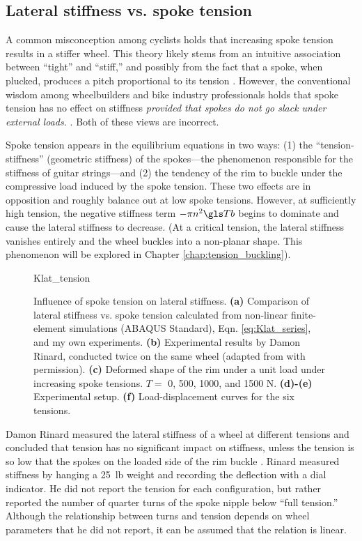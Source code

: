 \documentclass[\rootdir/thesis.tex]{subfiles}
\begin{document}
\subsection{Lateral stiffness vs. spoke tension}

A common misconception among cyclists holds that increasing spoke tension results in a stiffer wheel. This theory likely stems from an intuitive association between ``tight'' and ``stiff,'' and possibly from the fact that a spoke, when plucked, produces a pitch proportional to its tension \cite{Allen1997}. However, the conventional wisdom among wheelbuilders and bike industry professionals holds that spoke tension has no effect on stiffness \emph{provided that spokes do not go slack under external loads.} \cite{Rinard,Kopecky2013,Hjertberg2014,Glaskin2015}. Both of these views are incorrect.

Spoke tension appears in the equilibrium equations in two ways: (1) the ``tension-stiffness'' (geometric stiffness) of the spokes---the phenomenon responsible for the stiffness of guitar strings---and (2) the tendency of the rim to buckle under the compressive load induced by the spoke tension. These two effects are in opposition and roughly balance out at low spoke tensions. However, at sufficiently high tension, the negative stiffness term $-\pi n^2 \Tb$ begins to dominate and cause the lateral stiffness to decrease. (At a critical tension, the lateral stiffness vanishes entirely and the wheel buckles into a non-planar shape. This phenomenon will be explored in Chapter \ref{chap:tension_buckling}).

\begin{figure}[t]
\centering
{Klat_tension}
\caption{Influence of spoke tension on lateral stiffness. \textbf{(a)} Comparison of lateral stiffness vs. spoke tension calculated from non-linear finite-element simulations (ABAQUS Standard), Eqn. \eqref{eq:Klat_series}, and my own experiments. \textbf{(b)} Experimental results by Damon Rinard, conducted twice on the same wheel (adapted from \cite{Rinard} with permission). \textbf{(c)} Deformed shape of the rim under a unit load under increasing spoke tensions. $T=\,\,$0, 500, 1000, and 1500 N. \textbf{(d)-(e)} Experimental setup. \textbf{(f)} Load-displacement curves for the six tensions.}
\label{fig:Klat_tension}
\end{figure}

Damon Rinard measured the lateral stiffness of a wheel at different tensions and concluded that tension has no significant impact on stiffness, unless the tension is so low that the spokes on the loaded side of the rim buckle \cite{Rinard}. Rinard measured stiffness by hanging a \SI{25}{lb} weight and recording the deflection with a dial indicator. He did not report the tension for each configuration, but rather reported the number of quarter turns of the spoke nipple below ``full tension.'' Although the relationship between turns and tension depends on wheel parameters that he did not report, it can be assumed that the relation is linear.
\end{document}
